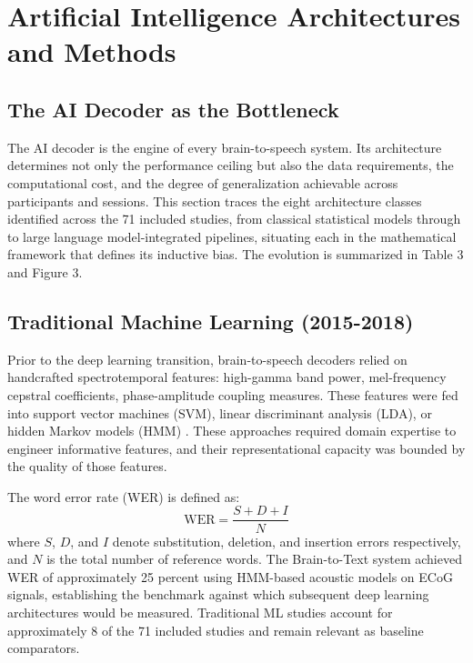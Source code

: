 
\section{Artificial Intelligence Architectures and Methods}
\label{sec:architectures}

\subsection{The AI Decoder as the Bottleneck}

The AI decoder is the engine of every brain-to-speech system. Its architecture determines not only the performance ceiling but also the data requirements, the computational cost, and the degree of generalization achievable across participants and sessions. This section traces the eight architecture classes identified across the 71 included studies, from classical statistical models through to large language model-integrated pipelines, situating each in the mathematical framework that defines its inductive bias. The evolution is summarized in Table 3 and Figure 3.

\subsection{Traditional Machine Learning (2015-2018)}

Prior to the deep learning transition, brain-to-speech decoders relied on handcrafted spectrotemporal features: high-gamma band power, mel-frequency cepstral coefficients, phase-amplitude coupling measures. These features were fed into support vector machines (SVM), linear discriminant analysis (LDA), or hidden Markov models (HMM) \cite{Lotte2018}. These approaches required domain expertise to engineer informative features, and their representational capacity was bounded by the quality of those features.

The word error rate (WER) is defined as:
\begin{equation}
\text{WER} = \frac{S + D + I}{N}
\end{equation}
where $S$, $D$, and $I$ denote substitution, deletion, and insertion errors respectively, and $N$ is the total number of reference words. The Brain-to-Text system \cite{Herff2015} achieved WER of approximately 25 percent using HMM-based acoustic models on ECoG signals, establishing the benchmark against which subsequent deep learning architectures would be measured. Traditional ML studies account for approximately 8 of the 71 included studies and remain relevant as baseline comparators.

